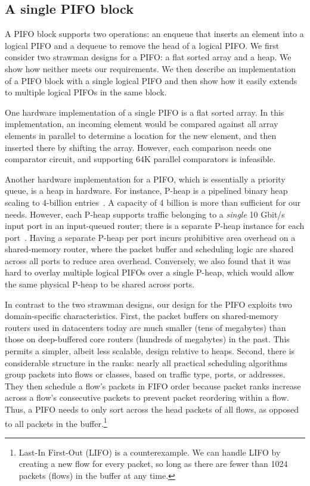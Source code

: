 \subsection{A single PIFO block}
\label{ss:single_block}

A PIFO block supports two operations: an enqueue that inserts an element into a
logical PIFO and a dequeue to remove the head of a logical PIFO.  We first
consider two strawman designs for a PIFO: a flat sorted array and a
heap. We show how neither meets our requirements. We then describe an
implementation of a PIFO block with a single logical PIFO and then show how
it easily extends to multiple logical PIFOs in the same block.

One hardware implementation of a single PIFO is a flat sorted array. In this
implementation, an incoming element would be compared against all array elements
in parallel to determine a location for the new element, and then inserted
there by shifting the array.  However, each comparison needs one comparator
circuit, and supporting 64K parallel comparators is infeasible.

Another hardware implementation for a PIFO, which is essentially a priority
queue, is a heap in hardware. For instance, P-heap is a pipelined binary
heap scaling to 4-billion entries~\cite{bhagwan, pheap}. A capacity of 4 billion
 is more than sufficient for our needs.  However, each P-heap supports
traffic belonging to a {\em single} 10 Gbit/s input port in an input-queued
router; there is a separate P-heap instance for each port~\cite{bhagwan}.
Having a separate P-heap per port incurs prohibitive area overhead on a
shared-memory router, where the packet buffer and scheduling logic are shared
across all ports to reduce area overhead.  Conversely, we also found that it
was hard to overlay multiple logical PIFOs over a single P-heap, which would
allow the same physical P-heap to be shared across ports.

In contrast to the two strawman designs, our design for the PIFO exploits two
domain-specific characteristics. First, the packet buffers on shared-memory routers
used in datacenters today are much smaller (tens of megabytes) than those on
deep-buffered core routers (hundreds of megabytes) in the past.  This permits a
simpler, albeit less scalable, design relative to heaps. Second, there is
considerable structure in the ranks: nearly all practical scheduling algorithms
group packets into flows or classes, \eg based on traffic type, ports, or
addresses. They then schedule a flow's packets in FIFO order because packet
ranks increase across a flow's consecutive packets to prevent packet reordering within a flow. Thus, a PIFO needs to only
sort across the head packets of all flows, as opposed to all packets in the
buffer.\footnote{Last-In First-Out (LIFO) is a counterexample.  We can handle
LIFO by creating a new flow for every packet, so long as there are fewer than
1024 packets (flows) in the buffer at any time.}

